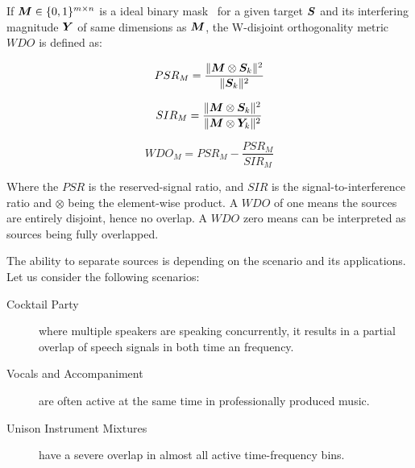 If \({\bm{M}} \in \{0, 1\}^{m\times n}\) is a ideal binary mask~\cite{wang05} for a given target \({\bm{S}}\) and its interfering magnitude \({\bm{Y}}\) of same dimensions as \({\bm{M}}\), the W-disjoint orthogonality metric \(WDO\) is defined as:

\begin{equation}
    PSR_{M} = \frac{\|{\bm{M}} \otimes {\bm{S}}_{k}\|^{2}}{\|{\bm{S}}_{k}\|^{2}}
\end{equation}

\begin{equation}
    SIR_{M}=\frac{\|{\bm{M}} \otimes {\bm{S}}_{k}\|^{2}}{\|{\bm{M}} \otimes {\bm{Y}}_{k}\|^{2}} 
\end{equation}

\begin{equation}
    WDO_{M} = PSR_{M} - \frac{PSR_{M}}{SIR_{M}}
\end{equation}

Where the \(PSR\) is the reserved-signal ratio, and \(SIR\) is the signal-to-interference ratio and \(\otimes\) being the element-wise product.
A \(WDO\) of one means the sources are entirely disjoint, hence no overlap.
A \(WDO\) zero means can be interpreted as sources being fully overlapped.
\par
The ability to separate sources is depending on the scenario and its applications.
Let us consider the following scenarios:

\begin{description}
  \item[Cocktail Party] where multiple speakers are speaking concurrently, it results in a partial overlap of speech signals in both time an frequency. 
  \item[Vocals and Accompaniment] are often active at the same time in professionally produced music.
  \item[Unison Instrument Mixtures] have a severe overlap in almost all active time-frequency bins.
\end{description}

